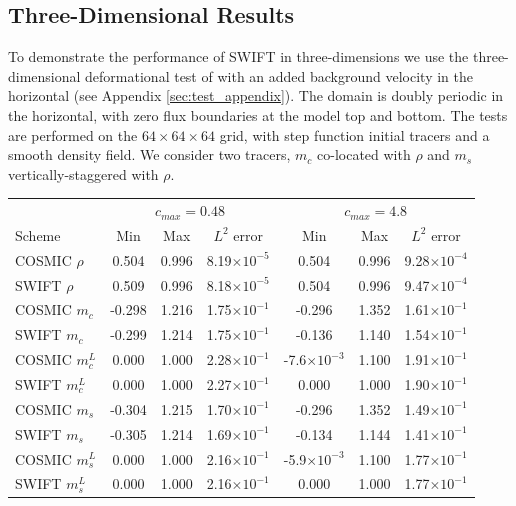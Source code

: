 \documentclass[11pt,a4paper]{article}
\begin{document}
\subsection{Three-Dimensional Results} \label{sec:resultd3d}
To demonstrate the performance of SWIFT in three-dimensions we use the three-dimensional deformational test of \cite{skamarock2006limiters} with an added background velocity in the horizontal (see Appendix \ref{sec:test_appendix}). The domain is doubly periodic in the horizontal, with zero flux boundaries at the model top and bottom. The tests are performed on the $64\times64\times64$ grid, with step function initial tracers and a smooth density field. We consider two tracers, $m_c$ co-located with $\rho$ and $m_s$ vertically-staggered with $\rho$.\\
\begin{table} [h!]
\small
\begin{center}
\begin{tabular}{| l | c c c | c c c |} \hline
  & \multicolumn{3}{c|}{$c_{max}=0.48$} & \multicolumn{3}{c|}{$c_{max}=4.8$} \\
Scheme & Min & Max & $L^2$ error & Min & Max & $L^2$ error \\ \hline
COSMIC $\rho$ & 0.504 & 0.996 & 8.19$\times 10^{-5}$ & 0.504 &  0.996 & 9.28$\times 10^{-4}$ \\ 
SWIFT $\rho$ & 0.509 & 0.996 & 8.18$\times 10^{-5}$ & 0.504 & 0.996 & 9.47$\times 10^{-4}$ \\
COSMIC $m_c$ & -0.298 & 1.216 & 1.75$\times 10^{-1}$ & -0.296 & 1.352 & 1.61$\times 10^{-1}$ \\ 
SWIFT $m_c$ & -0.299 & 1.214 & 1.75$\times 10^{-1}$ & -0.136 & 1.140 & 1.54$\times 10^{-1}$ \\ 
COSMIC $m^L_c$ & 0.000 & 1.000 & 2.28$\times 10^{-1}$ & -7.6$\times 10^{-3}$ & 1.100 & 1.91$\times 10^{-1}$  \\ 
SWIFT $m^L_c$ & 0.000 & 1.000 & 2.27$\times 10^{-1}$ & 0.000 & 1.000 & 1.90$\times 10^{-1}$ \\  
COSMIC $m_s$ & -0.304 & 1.215 & 1.70$\times 10^{-1}$ & -0.296 & 1.352 & 1.49$\times 10^{-1}$ \\ 
SWIFT $m_s$ & -0.305 & 1.214 & 1.69$\times 10^{-1}$ & -0.134 & 1.144 & 1.41$\times 10^{-1}$ \\ 
COSMIC $m^L_s$ & 0.000 & 1.000 & 2.16$\times 10^{-1}$ & -5.9$\times 10^{-3}$ &  1.100 & 1.77$\times 10^{-1}$ \\ 
SWIFT $m^L_s$ &  0.000 & 1.000 & 2.16$\times 10^{-1}$ & 0.000 &  1.000 & 1.77$\times 10^{-1}$ \\ 

\end{tabular}
\end{center}
\end{table}
\end{document}
